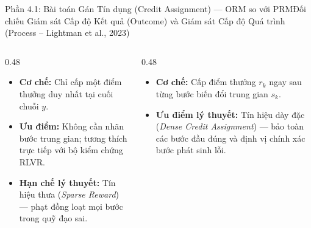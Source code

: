 \begin{frame}{Phần 4.1: Bài toán Gán Tín dụng (Credit Assignment) --- ORM so với PRM}{Đối chiếu Giám sát Cấp độ Kết quả (Outcome) và Giám sát Cấp độ Quá trình (Process -- Lightman et al., 2023)}
  \vspace{0.05cm}
  \begin{columns}[T,onlytextwidth]
    \begin{column}{0.48\textwidth}
      \footnotesize
      \begin{itemize}\setlength{\itemsep}{5pt}
        \item \textbf{Cơ chế:} Chỉ cấp một điểm thưởng duy nhất tại cuối chuỗi $y$.
        \item \textbf{Ưu điểm:} Không cần nhãn bước trung gian; tương thích trực tiếp với bộ kiểm chứng RLVR.
        \item \textbf{Hạn chế lý thuyết:} Tín hiệu thưa (\textit{Sparse Reward}) --- phạt đồng loạt mọi bước trong quỹ đạo sai.
      \end{itemize}
    \end{column}
    \begin{column}{0.48\textwidth}
      \footnotesize
      \begin{itemize}\setlength{\itemsep}{5pt}
        \item \textbf{Cơ chế:} Cấp điểm thưởng $r_k$ ngay sau từng bước biến đổi trung gian $s_k$.
        \item \textbf{Ưu điểm lý thuyết:} Tín hiệu dày đặc (\textit{Dense Credit Assignment}) --- bảo toàn các bước đầu đúng và định vị chính xác bước phát sinh lỗi.
      \end{itemize}
    \end{column}
  \end{columns}
\end{frame}


